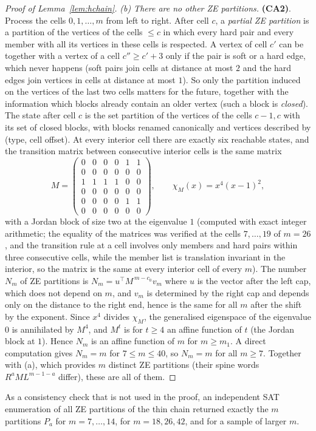 \begin{proof}[Proof of Lemma~\ref{lem:hchain}]
\emph{(b) There are no other ZE partitions.} \textbf{(CA2)}. Process the cells $0,1,\dots,m$ from left to right. After cell $c$, a \emph{partial ZE partition} is a partition of the vertices of the cells $\le c$ in which every hard pair and every member with all its vertices in these cells is respected. A vertex of cell $c'$ can be together with a vertex of a cell $c''\ge c'+3$ only if the pair is soft or a hard edge, which never happens (soft pairs join cells at distance at most $2$ and the hard edges join vertices in cells at distance at most $1$). So only the partition induced on the vertices of the last two cells matters for the future, together with the information which blocks already contain an older vertex (such a block is \emph{closed}). The state after cell $c$ is the set partition of the vertices of the cells $c-1,c$ with its set of closed blocks, with blocks renamed canonically and vertices described by (type, cell offset). At every interior cell there are exactly six reachable states, and the transition matrix between consecutive interior cells is the same matrix
\[
M=\begin{pmatrix}0&0&0&0&1&1\\0&0&0&0&0&0\\1&1&1&1&0&0\\0&0&0&0&0&0\\0&0&0&0&1&1\\0&0&0&0&0&0\end{pmatrix},\qquad\chi_M(x)=x^4(x-1)^2 ,
\]
with a Jordan block of size two at the eigenvalue $1$ (computed with exact integer arithmetic; the equality of the matrices was verified at the cells $7,\dots,19$ of $m=26$, and the transition rule at a cell involves only members and hard pairs within three consecutive cells, while the member list is translation invariant in the interior, so the matrix is the same at every interior cell of every $m$). The number $N_m$ of ZE partitions is $N_m=u^{\top}M^{\,m-c_0}v_m$ where $u$ is the vector after the left cap, which does not depend on $m$, and $v_m$ is determined by the right cap and depends only on the distance to the right end, hence is the same for all $m$ after the shift by the exponent. Since $x^4$ divides $\chi_M$, the generalised eigenspace of the eigenvalue $0$ is annihilated by $M^4$, and $M^{t}$ is for $t\ge4$ an affine function of $t$ (the Jordan block at $1$). Hence $N_m$ is an affine function of $m$ for $m\ge m_1$. A direct computation gives $N_m=m$ for $7\le m\le40$, so $N_m=m$ for all $m\ge7$. Together with (a), which provides $m$ distinct ZE partitions (their spine words $R^aML^{m-1-a}$ differ), these are all of them.
\end{proof}
\begin{remark}
As a consistency check that is not used in the proof, an independent SAT enumeration of all ZE partitions of the thin chain returned exactly the $m$ partitions $P_a$ for $m=7,\dots,14$, for $m=18,26,42$, and for a sample of larger $m$.
\end{remark}

